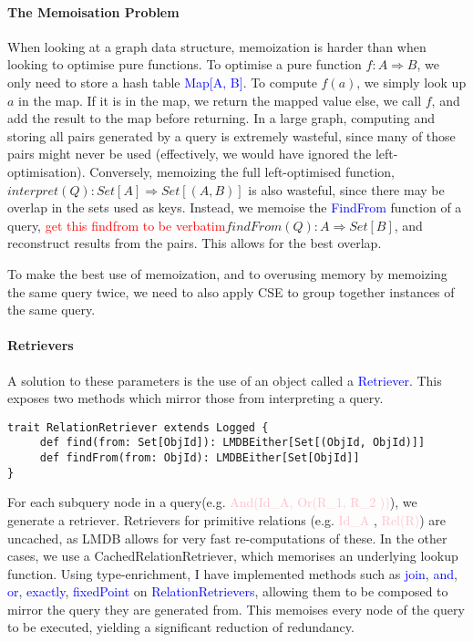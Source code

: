\documentclass[12pt,a4paper,twoside,openright]{report}
\newcommand\todo[1]{\textcolor{red}{#1}}
\newcommand\codeName[1]{\textcolor{blue}{#1}}
\newcommand\mathName[1]{\textcolor{pink}{#1}}
\begin{document}
{{		\paragraph{The Memoisation Problem}
		When looking at a graph data structure, memoization is harder than when looking to optimise pure functions. To optimise a pure function $f\colon A \Rightarrow B$, we only need to store a hash table \codeName{Map[A, B]}. To compute $f(a)$, we simply look up $a$ in the map. If it is in the map, we return the mapped value else, we call $f$, and add the result to the map before returning. In a large graph, computing and storing all pairs generated by a query is extremely wasteful, since many of those pairs might never be used (effectively, we would have ignored the left-optimisation). Conversely, memoizing the full left-optimised function, $interpret(Q)\colon Set[A] \Rightarrow Set[(A, B)]$ is also wasteful, since there may be overlap in the sets used as keys. Instead, we memoise the \codeName{FindFrom} function of a query, \todo{get this findfrom to be verbatim}$findFrom(Q)\colon A \Rightarrow Set[B]$, and reconstruct results from the pairs. This allows for the best overlap.

To make the best use of memoization, and to overusing memory by memoizing the same query twice, we need to also apply CSE to group together instances of the same query.

		\paragraph{Retrievers}
		A solution to these parameters is the use of an object called a \codeName{Retriever}. This exposes two methods which mirror those from interpreting a query. 
		
		\begin{framed}
			\begin{verbatim}
trait RelationRetriever extends Logged {
     def find(from: Set[ObjId]): LMDBEither[Set[(ObjId, ObjId)]]
     def findFrom(from: ObjId): LMDBEither[Set[ObjId]]
}
			\end{verbatim}
		\end{framed}
		For each subquery node in a query(e.g. \mathName{And(Id_A, Or(R_1, R_2 ))}), we generate a retriever. Retrievers for primitive relations (e.g. \mathName{Id_A} , \mathName{Rel(R)}) are uncached, as LMDB allows for very fast re-computations of these. In the other cases, we use a CachedRelationRetriever, which memorises an underlying lookup function. Using type-enrichment, I have implemented methods such as \codeName{join}, \codeName{and}, \codeName{or}, \codeName{exactly}, \codeName{fixedPoint} on \codeName{RelationRetrievers}, allowing them to be composed to mirror the query they are generated from. This memoises every node of the query to be executed, yielding a significant reduction of redundancy.
	
}}
\end{document}
